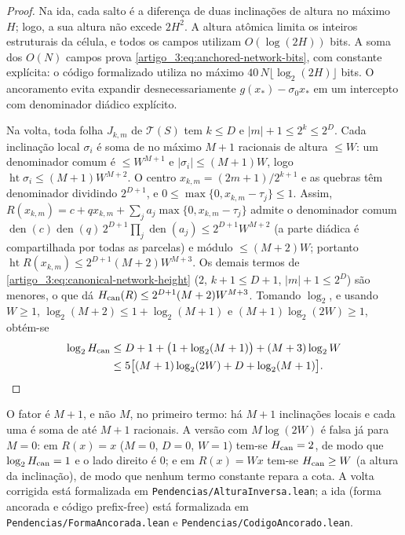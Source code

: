 \begin{proof}
Na ida, cada salto é a diferença de duas inclinações de altura no máximo
$H$; logo, a sua altura não excede $2H^2$. A altura atômica limita os inteiros
estruturais da célula, e todos os campos utilizam $O(\log(2H))$ bits. A soma dos
$O(N)$ campos prova \eqref{artigo_3:eq:anchored-network-bits}, com constante explícita:
o código formalizado utiliza no máximo $40\,N\lfloor\log_2(2H)\rfloor$ bits. O ancoramento evita
expandir desnecessariamente $g(x_*)-\sigma_0x_*$ em um intercepto com
denominador diádico explícito.

Na volta, toda folha $J_{k,m}$ de $\mathcal T(S)$ tem $k\le D$ e
$|m|+1\le 2^k\le 2^D$. Cada inclinação local $\sigma_i$ é soma de no máximo $M+1$
racionais de altura $\le W$: um denominador comum é $\le W^{M+1}$ e
$|\sigma_i|\le(M+1)W$, logo $\operatorname{ht}\sigma_i\le (M+1)W^{M+2}$. O centro
$x_{k,m}=(2m+1)/2^{k+1}$ e as quebras têm denominador dividindo $2^{D+1}$, e
$0\le \max\{0,x_{k,m}-\tau_j\}\le1$. Assim, $R(x_{k,m})=c+qx_{k,m}+\sum_j
a_j\max\{0,x_{k,m}-\tau_j\}$ admite o denominador comum
$\operatorname{den}(c)\operatorname{den}(q)\,2^{D+1}\prod_j\operatorname{den}(a_j)\le
2^{D+1}W^{M+2}$ (a parte diádica é compartilhada por todas as parcelas) e módulo
$\le (M+2)W$; portanto $\operatorname{ht}R(x_{k,m})\le 2^{D+1}(M+2)W^{M+3}$. Os
demais termos de \eqref{artigo_3:eq:canonical-network-height} ($2$, $k+1\le D+1$,
$|m|+1\le 2^D$) são menores, o que dá $H_{\rm can}(R)\le 2^{D+1}(M+2)W^{M+3}$.
Tomando $\log_2$, e usando $W\ge1$, $\log_2(M+2)\le 1+\log_2(M+1)$ e
$(M+1)\log_2(2W)\ge1$, obtém-se
\begin{align*}
 \log_2 H_{\rm can}
 &\le D+1+\bigl(1+\log_2(M+1)\bigr)+(M+3)\log_2 W\\
 &\le 5\bigl[(M+1)\log_2(2W)+D+\log_2(M+1)\bigr].
\end{align*}
\end{proof}

\begin{observacaoSN}\label{artigo_3:rem:reverse-height-correction}
O fator é $M+1$, e não $M$, no primeiro termo: há $M+1$ inclinações locais e
cada uma é soma de até $M+1$ racionais. A versão com $M\log(2W)$ é falsa já para
$M=0$: em $R(x)=x$ ($M=0$, $D=0$, $W=1$) tem-se $H_{\rm can}=2$, de modo que
$\log_2 H_{\rm can}=1$ e o lado direito é $0$; e em $R(x)=Wx$ tem-se
$H_{\rm can}\ge W$ (a altura da inclinação), de modo que nenhum termo constante
repara a cota. A volta corrigida está formalizada em
\texttt{Pendencias/AlturaInversa.lean}; a ida (forma ancorada e código prefix-free)
está formalizada em \texttt{Pendencias/FormaAncorada.lean} e
\texttt{Pendencias/CodigoAncorado.lean}.
\end{observacaoSN}

